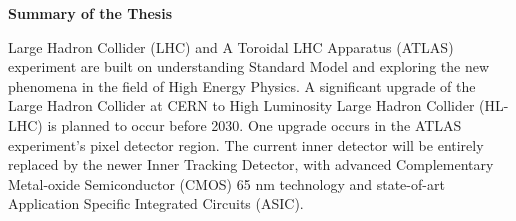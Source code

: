 \documentclass{article}
\begin{document}



  

\newpage
\begin{center}
  { \Large
  \textbf{Summary of the Thesis}
  }
\end{center}
\thispagestyle{empty}

Large Hadron Collider (LHC) and A Toroidal LHC Apparatus (ATLAS) experiment are built on
 understanding Standard Model and exploring the new phenomena in the field of High Energy Physics. 
 A significant upgrade of the Large Hadron Collider at CERN to High Luminosity Large Hadron Collider (HL-LHC) 
 is planned to occur before 2030. One upgrade occurs in the ATLAS experiment's pixel detector region. 
 The current inner detector will be entirely replaced by the newer Inner Tracking Detector, 
 with advanced Complementary Metal-oxide Semiconductor (CMOS) 65 nm technology and state-of-art 
 Application Specific Integrated Circuits (ASIC). 
\end{document}
